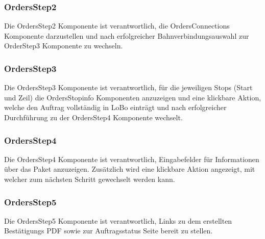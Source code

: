 \subsubsection{OrdersStep2}
Die OrdersStep2 Komponente ist verantwortlich, die OrdersConnections Komponente darzustellen und nach erfolgreicher Bahnverbindungsauswahl zur OrderStep3 Komponente zu wechseln.

\subsubsection{OrdersStep3}
Die OrdersStep3 Komponente ist verantwortlich, für die jeweiligen Stops (Start und Zeil) die OrdersStopinfo Komponenten anzuzeigen und eine klickbare Aktion, welche den Auftrag vollständig in LoBo einträgt und nach erfolgreicher Durchführung zu der OrdersStep4 Komponente wechselt.

\subsubsection{OrdersStep4}
Die OrdersStep4 Komponente ist verantwortlich, Eingabefelder für Informationen über das Paket anzuzeigen. Zusätzlich wird eine klickbare Aktion angezeigt, mit welcher zum nächsten Schritt gewechselt werden kann.

\subsubsection{OrdersStep5}
Die OrdersStep5 Komponente ist verantwortlich, Links zu dem erstellten Bestätigungs PDF sowie zur Auftragsstatus Seite bereit zu stellen.








